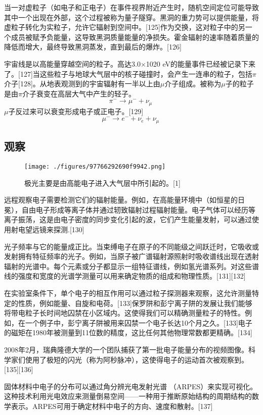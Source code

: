 当一对虚粒子（如电子和正电子）在事件视界附近产生时，随机空间定位可能导致其中一个出现在外部，这个过程被称为量子隧穿。黑洞的重力势可以提供能量，将虚粒子转化为实粒子，允许它辐射到空间中。[125]作为交换，这对粒子中的另一个成员被赋予负能量，这导致黑洞质量能量的净损失。霍金辐射的速率随着质量的降低而增大，最终导致黑洞蒸发，直到最后的爆炸。[126]

宇宙线是以高能量穿越空间的粒子。高达3.0×1020 eV的能量事件已经被记录下来了。[127]当这些粒子与地球大气层中的核子碰撞时，会产生一连串的粒子，包括$\pi$介子[128]。从地表观测到的宇宙辐射有一半以上由$\mu$介子组成。被称为$\mu$子的粒子是由$\pi$介子衰变在高层大气中产生的轻子。
$$\pi^- \to \mu^- +\nu_\mu~$$
$\mu$子反过来可以衰变形成电子或正电子。[129]
$$\mu^- \to e^- +\nu_e +\nu_\mu~$$

\subsection{观察}
\begin{figure}[ht]
\centering
\texttt{[image: ./figures/97766292690f9942.png]}
\caption{极光主要是由高能电子进入大气层中所引起的。[1]} \label{fig_DZ_15}
\end{figure}
远程观察电子需要检测它们的辐射能量。例如，在高能量环境中（如恒星的日冕），自由电子形成等离子体并通过轫致辐射过程辐射能量。电子气体可以经历等离子振荡，这是由电子密度的同步变化引起的波，它们产生能量发射，可以通过使用射电望远镜来探测.[130]

光子频率与它的能量成正比。当束缚电子在原子的不同能级之间跃迁时，它吸收或发射拥有特征频率的光子。例如，当原子被广谱辐射源照射时吸收谱线出现在透射辐射的光谱中。每个元素或分子都显示一组特征谱线，例如氢光谱系列。对这些谱线的强度和宽度的光谱学测量可以用来确定物质的组成和物理性质。[131][132]

在实验室条件下，单个电子的相互作用可以通过粒子探测器来观察，这允许测量特定的性质，例如能量、自旋和电荷。[133]保罗阱和彭宁离子阱的发展让我们能够将带电粒子长时间地囚禁在小区域内。这使得我们可以精确测量粒子的特性。例如，在一个例子中，彭宁离子阱被用来囚禁一个电子长达10个月之久。[133]电子的磁矩在1980年被测量到11位数的精度，这比任何其他物理常数都更精确。[134]

2008年2月，瑞典隆德大学的一个团队捕获了第一批电子能量分布的视频图像。科学家们使用了极短的闪光（称为阿秒脉冲），这使得电子的运动首次被观察到。[135][136]

固体材料中电子的分布可以通过角分辨光电发射光谱 （ARPES）来实现可视化。这种技术利用光电效应来测量倒易空间——一种用于推断原始结构的周期结构的数学表示。ARPES可用于确定材料中电子的方向、速度和散射。[137]

